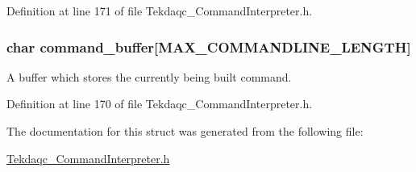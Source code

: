 Definition at line 171 of file Tekdaqc\-\_\-\-Command\-Interpreter.\-h.

\hypertarget{struct_tekdaqc___command_interpreter__t_a80b2496e0ec37858a3a015b964b11eda}{
\subsubsection[{command\-\_\-buffer}]{\setlength{\rightskip}{0pt plus 5cm}char command\-\_\-buffer\mbox{[}{\bf M\-A\-X\-\_\-\-C\-O\-M\-M\-A\-N\-D\-L\-I\-N\-E\-\_\-\-L\-E\-N\-G\-T\-H}\mbox{]}}}\label{struct_tekdaqc___command_interpreter__t_a80b2496e0ec37858a3a015b964b11eda}
A buffer which stores the currently being built command. 

Definition at line 170 of file Tekdaqc\-\_\-\-Command\-Interpreter.\-h.



The documentation for this struct was generated from the following file\-:\begin{DoxyCompactItemize}
\item 
\hyperlink{_tekdaqc___command_interpreter_8h}{Tekdaqc\-\_\-\-Command\-Interpreter.\-h}\end{DoxyCompactItemize}
